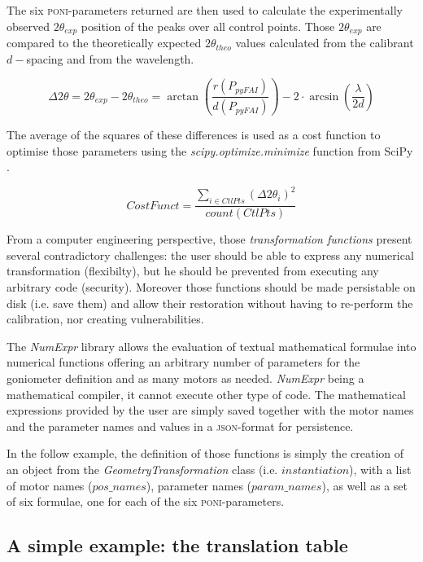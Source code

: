\documentclass[preprint]{iucr}              %
\begin{document}
The six \textsc{poni}-parameters returned 
are then used to
calculate the experimentally observed $2\theta_{exp}$ position of the peaks over all control
points.
Those $2\theta_{exp}$ are compared to
the theoretically expected $2\theta_{theo}$ values calculated from the calibrant $d-$spacing and
from the wavelength.

\begin{equation}
\Delta 2\theta = 2\theta _{exp} - 2\theta _{theo} =
\arctan(\frac{r(P_{pyFAI})}{d(P_{pyFAI})}) -  2 \cdot
\arcsin(\frac{\lambda}{2d})
\end{equation}


The average of the squares of these differences is used as a cost function
to optimise those parameters using the \textit{scipy.optimize.minimize}
function from SciPy \cite{scipy}.

\begin{equation}
CostFunct = \frac{ \sum\limits_{i \in CtlPts} {(\Delta 2\theta_i)^2}}
{count(CtlPts)} 
\end{equation}

From a computer engineering perspective, 
those \textit{transformation functions} present several contradictory challenges: 
the user should be able to express any numerical transformation (flexibilty),
but he should be prevented from executing any arbitrary code (security).  
Moreover those functions should be made persistable on disk (i.e. save them) and 
allow their restoration without having to re-perform the calibration, nor 
creating vulnerabilities. 

The \textit{NumExpr} library \cite{numexpr} allows the evaluation of 
textual mathematical formulae into numerical
functions offering an arbitrary number of parameters for 
the goniometer definition and as many motors as needed.
\textit{NumExpr} being a mathematical compiler, it cannot execute other type of code. 
The mathematical expressions provided by the user are simply saved together with the motor names 
and the parameter names and values in a \textsc{json}-format for persistence.

In the follow example, the definition of those functions is simply the creation 
of an object from the 
\textit{GeometryTransformation} class (i.e. $instantiation$), with a list of
motor names ($pos\_names$), parameter names ($param\_names$), as well as a set of six formulae, 
one for each of the six \textsc{poni}-parameters.

\subsection{A simple example: the translation table}
\end{document}
